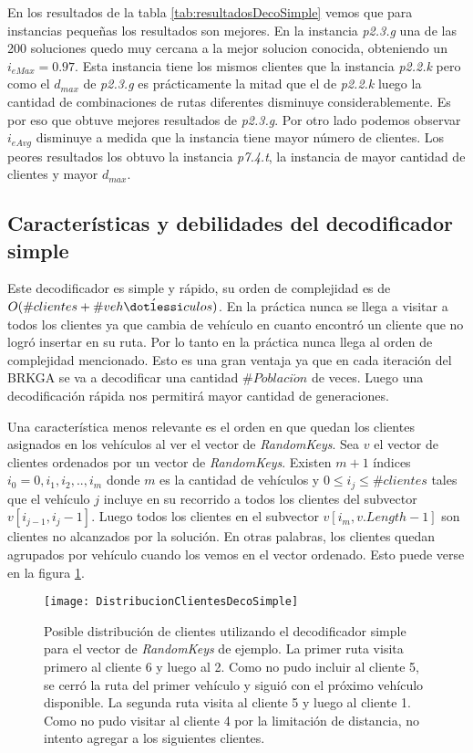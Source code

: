 En los resultados de la tabla \ref{tab:resultadosDecoSimple} vemos que para instancias pequeñas los resultados son mejores. En la instancia \textit{p2.3.g} una de las 200 soluciones quedo muy cercana a la mejor solucion conocida, obteniendo un $i_{eMax}=0.97$. Esta instancia tiene los mismos clientes que la instancia \textit{p2.2.k} pero como el $d_{max}$ de \textit{p2.3.g} es prácticamente la mitad que el de \textit{p2.2.k} luego la cantidad de combinaciones de rutas diferentes disminuye considerablemente. Es por eso que obtuve mejores resultados de \textit{p2.3.g}. Por otro lado podemos observar $i_{eAvg}$ disminuye a medida que la instancia tiene mayor número de clientes. Los peores resultados los obtuvo la instancia \textit{p7.4.t}, la instancia de mayor cantidad de clientes y mayor $d_{max}$.

\subsection{Características y debilidades del decodificador simple}

Este decodificador es simple y rápido, su orden de complejidad es de $O(\#clientes + \#veh\acute{\dotlessi}culos)$. En la práctica nunca se llega a visitar a todos los clientes ya que cambia de vehículo en cuanto encontró un cliente que no logró insertar en su ruta. Por lo tanto en la práctica nunca llega al orden de complejidad mencionado. Esto es una gran ventaja ya que en cada iteración del BRKGA se va a decodificar una cantidad $\#Poblaci\acute{o}n$ de veces. Luego una decodificación rápida nos permitirá mayor cantidad de generaciones.

\bigskip

Una característica menos relevante es el orden en que quedan los clientes asignados en los vehículos al ver el vector de \textit{RandomKeys}.  Sea $v$ el vector de clientes ordenados por un vector de \textit{RandomKeys}. Existen $m+1$ índices $i_0 = 0, i_1, i_2, .., i_m$ donde $m$ es la cantidad de vehículos y $0 \leq i_j \leq \#clientes$ tales que el vehículo $j$ incluye en su recorrido a todos los clientes del subvector $v[i_{j-1}, i_j-1]$. Luego todos los clientes en el subvector $v[i_m, v.Length - 1]$ son clientes no alcanzados por la solución. En otras palabras, los clientes quedan agrupados por vehículo cuando los vemos en el vector ordenado. Esto puede verse en la figura \ref{fig:DistribucionClientesDecoSimple}.

\begin{figure}[h]
	\caption{Posible distribución de clientes utilizando el decodificador simple para el vector de \textit{RandomKeys} de ejemplo. La primer ruta visita primero al cliente 6 y luego al 2. Como no pudo incluir al cliente 5, se cerró la ruta del primer vehículo y siguió con el próximo vehículo disponible. La segunda ruta visita al cliente 5 y luego al cliente 1. Como no pudo visitar al cliente 4 por la limitación de distancia, no intento agregar a los siguientes clientes.}
	\centering
	\texttt{[image: DistribucionClientesDecoSimple]}
	\label{fig:DistribucionClientesDecoSimple}
\end{figure}

